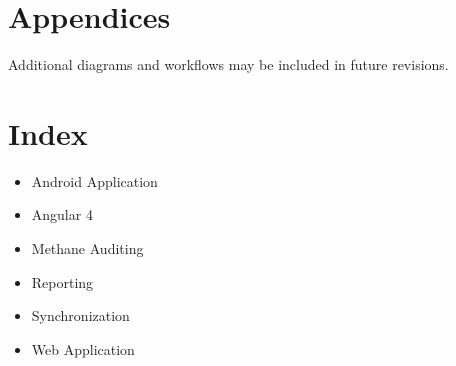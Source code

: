 \documentclass[12pt]{article}
\begin{document}
\section{Appendices}

Additional diagrams and workflows may be included in future revisions.

\section{Index}

\begin{itemize}
\item Android Application
\item Angular 4
\item Methane Auditing
\item Reporting
\item Synchronization
\item Web Application
\end{itemize}
\end{document}
